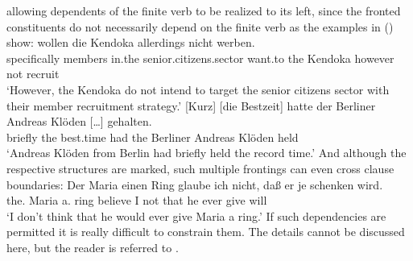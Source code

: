 allowing dependents of the finite verb to be realized to its left, since the fronted constituents do
not necessarily depend on the finite verb as the examples in () show:
\eal
\ex
\label{ex-mehrfach-vf-adv-acc}
\gll [Gezielt] [Mitglieder] [im     Seniorenbereich]       wollen  die Kendoka allerdings nicht werben.\footnotemark\\
    \spacebr{}specifically \spacebr{}members     \spacebr{}in.the senior.citizens.sector want.to the Kendoka however    not   recruit\\
\glt `However, the Kendoka do not intend to target the senior citizens sector with their member recruitment strategy.'%
\label{bsp-gezielt-mitglieder}
\ex 
\gll {}[Kurz] [die Bestzeit] hatte der Berliner Andreas Klöden [\ldots] gehalten.\footnotemark\\
	 \spacebr{}briefly \spacebr{}the best.time had the Berliner Andreas Klöden {} held\\
\label{bsp-kurz-die-bestzeit}     
\glt `Andreas Klöden from Berlin had briefly held the record time.'
\zl
And although the respective structures are marked, such multiple frontings can even cross clause boundaries:
\ea 
\gll Der        Maria einen    Ring glaube  ich nicht, daß  er je   schenken wird.\footnotemark\\
     the.\dat{} Maria a.\acc{} ring believe I   not    that he ever give     will\\
\glt `I don't think that he would ever give Maria a ring.'
\z
If such dependencies are permitted it is really difficult to constrain them. The details cannot be
discussed here, but the reader is referred to .

